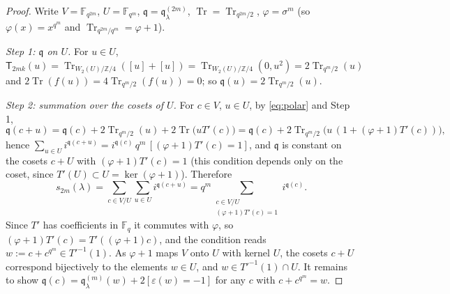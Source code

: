 \documentclass[12pt,a4paper]{amsart}
\theoremstyle{definition}
\newcommand{\F}{\mathbb{F}}
\newcommand{\Z}{\mathbb{Z}}
\newcommand{\Tr}{\operatorname{Tr}}
\newcommand{\eps}{\varepsilon}
\newcommand{\qq}{\mathfrak{q}}
\newcommand{\Tw}{\mathsf{T}}
\begin{document}
\begin{proof}
Write $V=\F_{q^{2m}}$, $U=\F_{q^m}$, $\qq=\qq^{(2m)}_\lambda$, $\Tr=\Tr_{q^{2m}/2}$, $\varphi=\sigma^m$ (so $\varphi(x)=x^{q^m}$ and $\Tr_{q^{2m}/q^m}=\varphi+1$).

\emph{Step 1: $\qq$ on $U$.} For $u\in U$, $\Tw_{2mk}(u)=\Tr_{W_2(U)/\Z/4}([u]+[u])=\Tr_{W_2(U)/\Z/4}(0,u^2)=2\Tr_{q^m/2}(u)$ and $2\Tr(f(u))=4\Tr_{q^m/2}(f(u))=0$; so $\qq(u)=2\Tr_{q^m/2}(u)$.

\emph{Step 2: summation over the cosets of $U$.} For $c\in V$, $u\in U$, by \eqref{eq:polar} and Step 1,
\[
\qq(c+u)=\qq(c)+2\Tr_{q^m/2}(u)+2\Tr\bigl(uT'(c)\bigr)=\qq(c)+2\Tr_{q^m/2}\bigl(u\,(1+(\varphi+1)T'(c))\bigr),
\]
hence $\sum_{u\in U}i^{\qq(c+u)}=i^{\qq(c)}\,q^m\,[(\varphi+1)T'(c)=1]$, and $\qq$ is constant on the cosets $c+U$ with $(\varphi+1)T'(c)=1$ (this condition depends only on the coset, since $T'(U)\subset U=\ker(\varphi+1)$). Therefore
\[
s_{2m}(\lambda)=\sum_{c\in V/U}\sum_{u\in U}i^{\qq(c+u)}=q^m\sum_{\substack{c\in V/U\\ (\varphi+1)T'(c)=1}}i^{\qq(c)} .
\]
Since $T'$ has coefficients in $\F_q$ it commutes with $\varphi$, so $(\varphi+1)T'(c)=T'((\varphi+1)c)$, and the condition reads $w:=c+c^{q^m}\in T'^{-1}(1)$. As $\varphi+1$ maps $V$ onto $U$ with kernel $U$, the cosets $c+U$ correspond bijectively to the elements $w\in U$, and $w\in T'^{-1}(1)\cap U$. It remains to show $\qq(c)=\qq^{(m)}_\lambda(w)+2[\eps(w)=-1]$ for any $c$ with $c+c^{q^m}=w$.


\end{proof}
\end{document}
